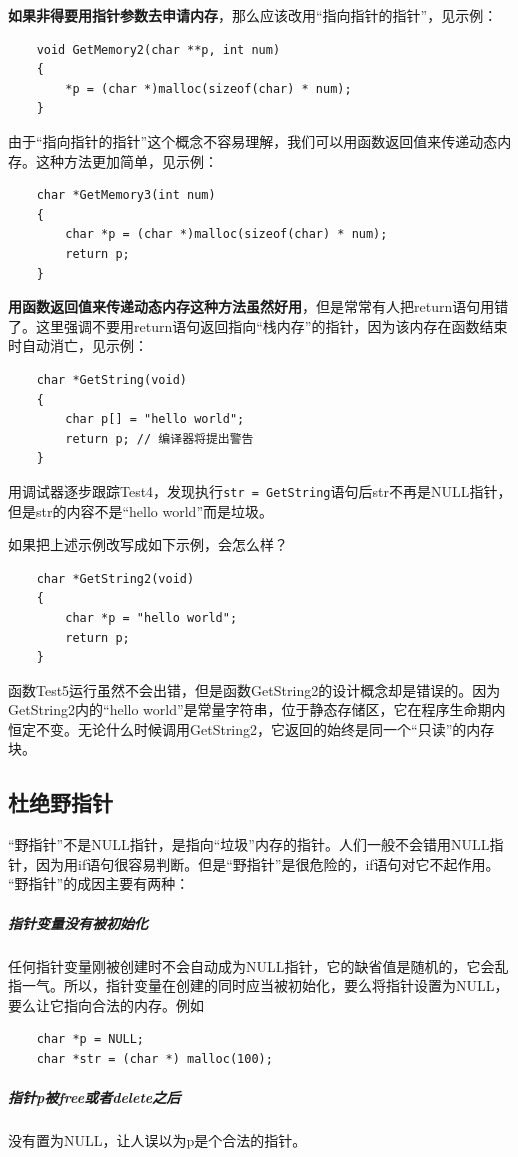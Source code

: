 \documentclass[UTF8,a4paper,12pt]{ctexbook}
\begin{document}
			\textbf{如果非得要用指针参数去申请内存}，那么应该改用“指向指针的指针”，见示例：
			\begin{lstlisting}
	void GetMemory2(char **p, int num)
	{	
		*p = (char *)malloc(sizeof(char) * num);	
	}
			\end{lstlisting}
			由于“指向指针的指针”这个概念不容易理解，我们可以用函数返回值来传递动态内存。这种方法更加简单，见示例：
			\begin{lstlisting}
	char *GetMemory3(int num)
	{
		char *p = (char *)malloc(sizeof(char) * num);
		return p;	
	}
			\end{lstlisting}
			\textbf{用函数返回值来传递动态内存这种方法虽然好用}，但是常常有人把return语句用错了。这里强调不要用return语句返回指向“栈内存”的指针，因为该内存在函数结束时自动消亡，见示例：
			\begin{lstlisting}
	char *GetString(void)
	{
		char p[] = "hello world";
		return p; // 编译器将提出警告
	}
			\end{lstlisting}
			用调试器逐步跟踪Test4，发现执行\verb|str = GetString|语句后str不再是NULL指针，但是str的内容不是“hello world”而是垃圾。
			
			如果把上述示例改写成如下示例，会怎么样？
			\begin{lstlisting}
	char *GetString2(void)
	{
		char *p = "hello world";
		return p;
	}
			\end{lstlisting}
			函数Test5运行虽然不会出错，但是函数GetString2的设计概念却是错误的。因为GetString2内的“hello world”是常量字符串，位于静态存储区，它在程序生命期内恒定不变。无论什么时候调用GetString2，它返回的始终是同一个“只读”的内存块。
			
		\subsection{杜绝野指针}
			“野指针”不是NULL指针，是指向“垃圾”内存的指针。人们一般不会错用NULL指针，因为用if语句很容易判断。但是“野指针”是很危险的，if语句对它不起作用。 “野指针”的成因主要有两种：
			
			\subparagraph{指针变量没有被初始化}
				任何指针变量刚被创建时不会自动成为NULL指针，它的缺省值是随机的，它会乱指一气。所以，指针变量在创建的同时应当被初始化，要么将指针设置为NULL，要么让它指向合法的内存。例如
				\begin{lstlisting}
	char *p = NULL;
	char *str = (char *) malloc(100);
				\end{lstlisting}
			
			
			\subparagraph{指针p被free或者delete之后}
				没有置为NULL，让人误以为p是个合法的指针。
			
\end{document}
